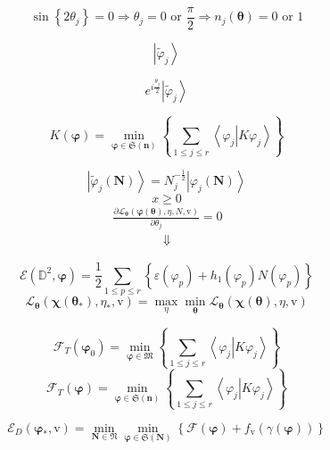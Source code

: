 \documentclass[aps,preprint]{revtex4}%
\begin{document}
\[
\sin\left\{  2\theta_{j}\right\}  =0\Rightarrow\theta_{j}=0\text{ or }%
\frac{\pi}{2}\Rightarrow n_{j}\left(  \mathbf{\theta}\right)  =0\text{ or }1
\]
%

\[
\left\vert \tilde{\varphi}_{j}\right\rangle
\]
%

\[
e^{i\frac{\theta_{j}}{2}}\left\vert \tilde{\varphi}_{j}\right\rangle
\]
%

\[
K\left(  \mathbf{\varphi}\right)  =\min_{\mathbf{\varphi\in}\mathfrak{S}%
\left(  \mathbf{n}\right)  }\left\{  \sum_{1\leq j\leq r}\left\langle \left.
\varphi_{j}\right\vert K\varphi_{j}\right\rangle \right\}
\]
%

\[
\left\vert \tilde{\varphi}_{j}\left(  \mathbf{N}\right)  \right\rangle
=N_{j}^{-\frac{1}{2}}\left\vert \varphi_{j}\left(  \mathbf{N}\right)
\right\rangle
\]%
\[
x\geq0
\]%
\begin{align*}
&  \frac{\partial\mathcal{L}_{\mathbf{\theta}}\left(  \mathbf{\varphi}\left(
\mathbf{\theta}\right)  ,\eta\mathbf{,}N\mathbf{,}\mathrm{v}\right)
}{\partial\theta_{j}}=0\text{ }\\
&  \qquad\qquad\left.  \Downarrow\right.
\end{align*}
%

\[
\mathcal{E}\left(  \mathbb{D}^{2},\mathbf{\varphi}\right)  =\frac{1}{2}%
\sum_{1\leq p\leq r}\left\{  \varepsilon\left(  \varphi_{p}\right)
+h_{1}\left(  \varphi_{p}\right)  N\left(  \varphi_{p}\right)  \right\}
\]%
\[
\mathcal{L}_{\mathbf{\theta}}\left(  \mathbf{\chi}\left(  \mathbf{\theta
}_{\ast}\right)  ,\eta_{\ast},\mathrm{v}\right)  =\max_{\eta}\min
_{\mathbf{\theta}}\mathcal{L}_{\mathbf{\theta}}\left(  \mathbf{\chi}\left(
\mathbf{\theta}\right)  ,\eta,\mathrm{v}\right)
\]
%

\[
\mathcal{F}_{T}\left(  \mathbf{\varphi}_{0}\right)  =\min_{\mathbf{\varphi\in
}\mathfrak{M}}\left\{  \sum_{1\leq j\leq r}\left\langle \left.  \varphi
_{j}\right\vert K\varphi_{j}\right\rangle \right\}
\]%
\[
\mathcal{F}_{T}\left(  \mathbf{\varphi}\right)  =\min_{\mathbf{\varphi\in
}\mathfrak{S}\left(  \mathbf{n}\right)  }\left\{  \sum_{1\leq j\leq
r}\left\langle \left.  \varphi_{j}\right\vert K\varphi_{j}\right\rangle
\right\}
\]
%

\[
\mathcal{E}_{D}\left(  \mathbf{\varphi}_{\ast}\mathbf{,}\mathrm{v}\right)
=\min_{\mathbf{N\in}\mathfrak{N}}\min_{\mathbf{\varphi\in}\mathfrak{S}\left(
\mathbf{N}\right)  }\left\{  \mathcal{F}\left(  \mathbf{\varphi}\right)
+f_{\mathrm{v}}\left(  \gamma\left(  \mathbf{\varphi}\right)  \right)
\right\}
\]
%
\end{document}
